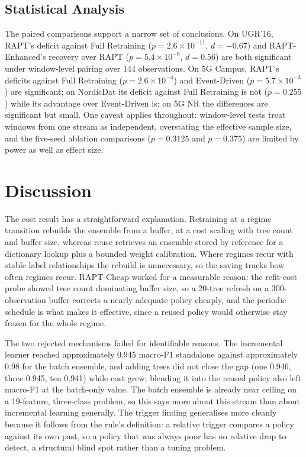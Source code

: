 \documentclass[conference]{IEEEtran}
\begin{document}
\subsection{Statistical Analysis}
The paired comparisons support a narrow set of conclusions. On UGR'16, RAPT's deficit
against Full Retraining ($p = 2.6 \times 10^{-11}$, $d = -0.67$) and RAPT-Enhanced's
recovery over RAPT ($p = 5.4 \times 10^{-9}$, $d = 0.56$) are both significant under
window-level pairing over 144 observations. On 5G Campus, RAPT's deficits against
Full Retraining ($p = 2.6 \times 10^{-4}$) and Event-Driven ($p = 5.7 \times 10^{-3}$)
are significant; on NordicDat its deficit against Full Retraining is not ($p = 0.255$)
while its advantage over Event-Driven is; on 5G NR the differences are significant but
small. One caveat applies throughout: window-level tests treat windows from one stream
as independent, overstating the effective sample size, and the five-seed ablation
comparisons ($p = 0.3125$ and $p = 0.375$) are limited by power as well as effect
size.

\section{Discussion}

The cost result has a straightforward explanation. Retraining at a regime transition
rebuilds the ensemble from a buffer, at a cost scaling with tree count and buffer
size, whereas reuse retrieves an ensemble stored by reference for a dictionary lookup
plus a bounded weight calibration. Where regimes recur with stable label relationships
the rebuild is unnecessary, so the saving tracks how often regimes recur. RAPT-Cheap
worked for a measurable reason: the refit-cost probe showed tree count dominating
buffer size, so a 20-tree refresh on a 300-observation buffer corrects a nearly
adequate policy cheaply, and the periodic schedule is what makes it effective, since a
reused policy would otherwise stay frozen for the whole regime.

The two rejected mechanisms failed for identifiable reasons. The incremental learner
reached approximately 0.945 macro-F1 standalone against approximately 0.98 for the
batch ensemble, and adding trees did not close the gap (one 0.946, three 0.945, ten
0.941) while cost grew; blending it into the reused policy also left macro-F1 at the
batch-only value. The batch ensemble is already near ceiling on a 19-feature,
three-class problem, so this says more about this stream than about incremental
learning generally. The trigger finding generalises more cleanly because it follows
from the rule's definition: a relative trigger compares a policy against its own past,
so a policy that was always poor has no relative drop to detect, a structural blind
spot rather than a tuning problem.
\end{document}
